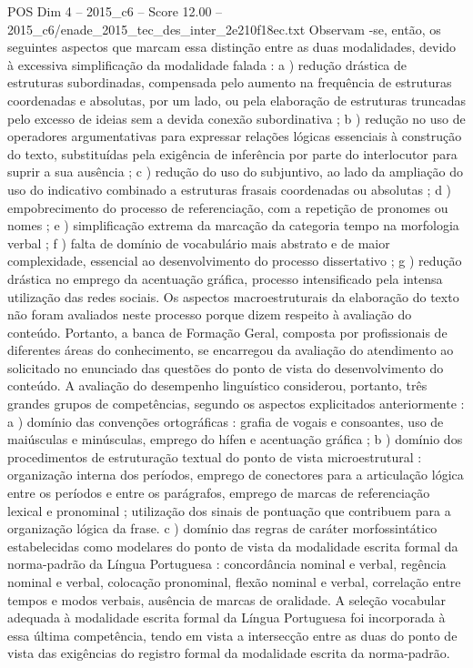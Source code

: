 \begin{textsample}{POS Dim 4 – 2015\_c6 – Score 12.00 – 2015\_c6/enade\_2015\_tec\_des\_inter\_2e210f18ec.txt}
Observam -se, então, os seguintes aspectos que marcam essa distinção entre as duas modalidades, devido à excessiva simplificação da modalidade falada : a ) redução drástica de estruturas subordinadas, compensada pelo aumento na frequência de estruturas coordenadas e absolutas, por um lado, ou pela elaboração de estruturas truncadas pelo excesso de ideias sem a devida conexão subordinativa ; b ) redução no uso de operadores argumentativas para expressar relações lógicas essenciais à construção do texto, substituídas pela exigência de inferência por parte do interlocutor para suprir a sua ausência ; c ) redução do uso do subjuntivo, ao lado da ampliação do uso do indicativo combinado a estruturas frasais coordenadas ou absolutas ; d ) empobrecimento do processo de referenciação, com a repetição de pronomes ou nomes ; e ) simplificação extrema da marcação da categoria tempo na morfologia verbal ; f ) falta de domínio de vocabulário mais abstrato e de maior complexidade, essencial ao desenvolvimento do processo dissertativo ; g ) redução drástica no emprego da acentuação gráfica, processo intensificado pela intensa utilização das redes sociais.
Os aspectos macroestruturais da elaboração do texto não foram avaliados neste processo porque dizem respeito à avaliação do conteúdo.
Portanto, a banca de Formação Geral, composta por profissionais de diferentes áreas do conhecimento, se encarregou da avaliação do atendimento ao solicitado no enunciado das questões do ponto de vista do desenvolvimento do conteúdo.
A avaliação do desempenho linguístico considerou, portanto, três grandes grupos de competências, segundo os aspectos explicitados anteriormente : a ) domínio das convenções ortográficas : grafia de vogais e consoantes, uso de maiúsculas e minúsculas, emprego do hífen e acentuação gráfica ; b ) domínio dos procedimentos de estruturação textual do ponto de vista microestrutural : organização interna dos períodos, emprego de conectores para a articulação lógica entre os períodos e entre os parágrafos, emprego de marcas de referenciação lexical e pronominal ; utilização dos sinais de pontuação que contribuem para a organização lógica da frase. c ) domínio das regras de caráter morfossintático estabelecidas como modelares do ponto de vista da modalidade escrita formal da norma-padrão da Língua Portuguesa : concordância nominal e verbal, regência nominal e verbal, colocação pronominal, flexão nominal e verbal, correlação entre tempos e modos verbais, ausência de marcas de oralidade.
A seleção vocabular adequada à modalidade escrita formal da Língua Portuguesa foi incorporada à essa última competência, tendo em vista a intersecção entre as duas do ponto de vista das exigências do registro formal da modalidade escrita da norma-padrão.

\end{textsample}

